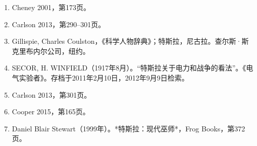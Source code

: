 \begin{enumerate}
\item Cheney 2001，第173页。  
\item Carlson 2013，第290–301页。  
\item Gillispie, Charles Coulston，《科学人物辞典》；特斯拉，尼古拉。查尔斯·斯克里布内尔公司，纽约。  
\item SECOR, H. WINFIELD（1917年8月）。“特斯拉关于电力和战争的看法”。《电气实验者》。存档于2011年2月10日，2012年9月9日检索。  
\item Carlson 2013，第301页。  
\item Cooper 2015，第165页。  
\item Daniel Blair Stewart（1999年）。*特斯拉：现代巫师*，Frog Books，第372页。
\end{enumerate}